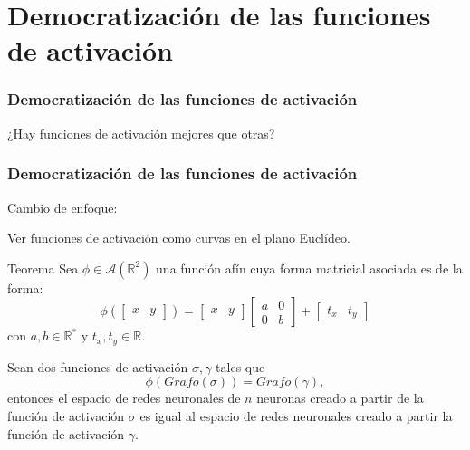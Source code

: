 \documentclass{beamer}
\newcommand{\R}{\mathbb{R}}
\begin{document}
\section{Democratización de las funciones de activación} 
\begin{frame}
    \frametitle{Democratización de las funciones de activación}
    ¿Hay funciones de activación mejores que otras?
\end{frame}
\begin{frame}
    \frametitle{Democratización de las funciones de activación}
    Cambio de enfoque: 

    Ver funciones de activación como curvas en el plano Euclídeo.  

    \begin{exampleblock}{Teorema}
        Sea $\phi \in \mathcal{A}(\R^2)$ una función afín 
        cuya forma matricial asociada es de la forma:  
        \begin{equation*}
            \phi 
            \left( 
                \begin{bmatrix}
                    x & y
                \end{bmatrix}
            \right)
            = 
            \begin{bmatrix}
                x & y
            \end{bmatrix}
            \begin{bmatrix}
                a & 0 \\
                 0& b 
            \end{bmatrix}
            +
            \begin{bmatrix}
                t_x & t_y
            \end{bmatrix}
        \end{equation*}
        con $a,b \in \R^*$ y $t_x, t_y \in \R$.
    
        Sean dos funciones de activación $\sigma, \gamma$ tales que 
        \begin{equation*}
            \phi(Grafo(\sigma)) = Grafo(\gamma),
        \end{equation*}
        entonces 
        el espacio de redes neuronales de $n$ neuronas creado a partir de la función de activación $\sigma$ es  
        igual al espacio de redes neuronales creado a partir la función de activación $\gamma$. 
    \end{exampleblock}
\end{frame}
\end{document}
